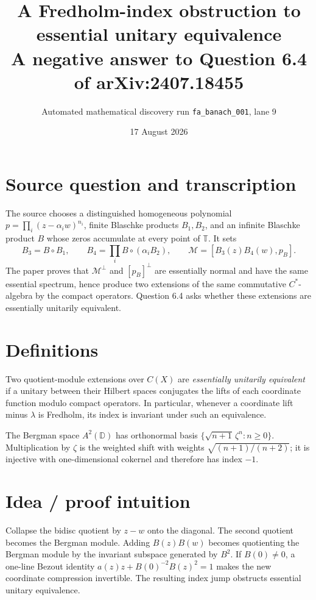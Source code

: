 \documentclass[11pt]{article}
\title{A Fredholm-index obstruction to essential unitary equivalence\\
\large A negative answer to Question 6.4 of arXiv:2407.18455}
\author{Automated mathematical discovery run \texttt{fa\_banach\_001}, lane 9}
\date{17 August 2026}
\newcommand{\D}{\mathbb D}
\newcommand{\T}{\mathbb T}
\newcommand{\M}{\mathcal M}
\newcommand{\A}{A^2(\D)}
\begin{document}
\maketitle

\begin{center}
\end{center}

\section*{Source question and transcription}
The source chooses a distinguished homogeneous polynomial
\(p=\prod_i(z-\alpha_iw)^{n_i}\), finite Blaschke products \(B_1,B_2\), and
an infinite Blaschke product \(B\) whose zeros accumulate at every point of
\(\T\).  It sets
\[
 B_3=B\circ B_1,\qquad B_4=\prod_i B\circ(\alpha_iB_2),\qquad
 \M=[B_3(z)B_4(w),p_B].
\]
The paper proves that \(\M^\perp\) and \([p_B]^\perp\) are essentially
normal and have the same essential spectrum, hence produce two extensions
of the same commutative \(C^*\)-algebra by the compact operators.  Question
6.4 asks whether these extensions are essentially unitarily equivalent.

\section*{Definitions}
Two quotient-module extensions over \(C(X)\) are \emph{essentially unitarily
equivalent} if a unitary between their Hilbert spaces conjugates the lifts of
each coordinate function modulo compact operators.  In particular, whenever
a coordinate lift minus \(\lambda\) is Fredholm, its index is invariant under
such an equivalence.

The Bergman space \(\A\) has orthonormal basis
\(\{\sqrt{n+1}\,\zeta^n:n\geq0\}\).  Multiplication by \(\zeta\) is the
weighted shift with weights \(\sqrt{(n+1)/(n+2)}\); it is injective with
one-dimensional cokernel and therefore has index \(-1\).

\section*{Idea / proof intuition}
Collapse the bidisc quotient by \(z-w\) onto the diagonal.  The second
quotient becomes the Bergman module.  Adding \(B(z)B(w)\) becomes quotienting
the Bergman module by the invariant subspace generated by \(B^2\).  If
\(B(0)\ne0\), a one-line Bezout identity
\(a(z)z+B(0)^{-2}B(z)^2=1\) makes the new coordinate compression invertible.
The resulting index jump obstructs essential unitary equivalence.
\end{document}
